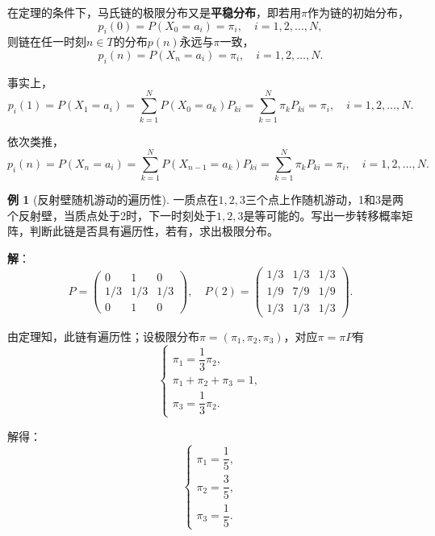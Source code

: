 \documentclass[11pt,a4paper]{report}
\theoremstyle{definition}
\newtheorem{example}{例}[chapter]
\begin{document}
在定理的条件下，马氏链的极限分布又是\textbf{平稳分布}，即若用$\pi$作为链的初始分布，
\[
p_i(0)=P(X_0=a_i)=\pi_i,\quad i=1,2,\ldots,N,
\]
则链在任一时刻$n\in T$的分布$p(n)$永远与$\pi$一致，
\[
p_i(n)=P(X_n=a_i)=\pi_i,\quad i=1,2,\ldots,N.
\]

事实上，
\[
p_i(1)=P(X_1=a_i)=\sum_{k=1}^{N}P(X_0=a_k)P_{ki}=\sum_{k=1}^{N}\pi_kP_{ki}=\pi_i,\quad i=1,2,\ldots,N.
\]

依次类推，
\[
p_i(n)=P(X_n=a_i)=\sum_{k=1}^{N}P(X_{n-1}=a_k)P_{ki}=\sum_{k=1}^{N}\pi_kP_{ki}=\pi_i,\quad i=1,2,\ldots,N.
\]

\begin{example}[反射壁随机游动的遍历性]
一质点在$1,2,3$三个点上作随机游动，1和3是两个反射壁，当质点处于2时，下一时刻处于$1,2,3$是等可能的。写出一步转移概率矩阵，判断此链是否具有遍历性，若有，求出极限分布。

\textbf{解}：
\[
P=
\begin{pmatrix}
0 & 1 & 0\\
1/3 & 1/3 & 1/3\\
0 & 1 & 0
\end{pmatrix},
\quad
P(2)=
\begin{pmatrix}
1/3 & 1/3 & 1/3\\
1/9 & 7/9 & 1/9\\
1/3 & 1/3 & 1/3
\end{pmatrix}.
\]

由定理知，此链有遍历性；设极限分布$\pi=(\pi_1,\pi_2,\pi_3)$，对应$\pi=\pi P$有
\[
\begin{cases}
\pi_1=\dfrac{1}{3}\pi_2,\\[0.5em]
\pi_1+\pi_2+\pi_3=1,\\[0.5em]
\pi_3=\dfrac{1}{3}\pi_2.
\end{cases}
\]

解得：
\[
\begin{cases}
\pi_1=\dfrac{1}{5},\\[0.5em]
\pi_2=\dfrac{3}{5},\\[0.5em]
\pi_3=\dfrac{1}{5}.
\end{cases}
\]
\end{example}
\end{document}
